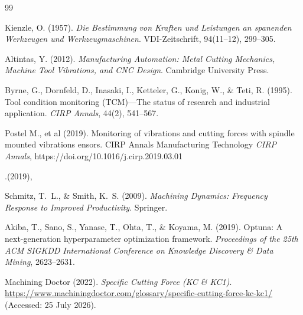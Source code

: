 \documentclass[12pt, letterpaper]{article}
\begin{document}
\begin{thebibliography}{99}

Kienzle, O. (1957).
\textit{Die Bestimmung von Kraften und Leistungen an spanenden Werkzeugen
und Werkzeugmaschinen}.
VDI-Zeitschrift, 94(11--12), 299--305.

Altintas, Y. (2012).
\textit{Manufacturing Automation: Metal Cutting Mechanics, Machine Tool
Vibrations, and CNC Design}.
Cambridge University Press.

Byrne, G., Dornfeld, D., Inasaki, I., Ketteler, G., Konig, W., \& Teti, R.
(1995).
Tool condition monitoring (TCM)---The status of research and industrial
application.
\textit{CIRP Annals}, 44(2), 541--567.

Postel M., et al (2019). Monitoring of vibrations and cutting forces with spindle mounted vibrations ensors. CIRP Annals Manufacturing Technology
\textit{CIRP Annals}, https://doi.org/10.1016/j.cirp.2019.03.01

.(2019),

Schmitz, T.~L., \& Smith, K.~S. (2009).
\textit{Machining Dynamics: Frequency Response to Improved Productivity}.
Springer.

Akiba, T., Sano, S., Yanase, T., Ohta, T., \& Koyama, M. (2019).
Optuna: A next-generation hyperparameter optimization framework.
\textit{Proceedings of the 25th ACM SIGKDD International Conference on
Knowledge Discovery \& Data Mining}, 2623--2631.

Machining Doctor (2022). \textit{Specific Cutting Force (KC \& KC1)}.
\url{https://www.machiningdoctor.com/glossary/specific-cutting-force-kc-kc1/}
(Accessed: 25 July 2026).


\end{thebibliography}
\end{document}
